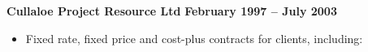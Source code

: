 \documentclass[10pt]{article}
\newenvironment{outerlist}[1][\enskip\textbullet]%
        {\begin{itemize}[#1]}{\end{itemize}%
         \vspace{-.6\baselineskip}}
\newcommand{\blankline}{\quad\pagebreak[2]}
\begin{document}
%

\blankline

\textbf{Cullaloe Project Resource Ltd}        \hfill \textbf{February 1997 -- July 2003}

\begin{outerlist}
\item[] Fixed rate, fixed price and cost-plus contracts for clients, including:

\begin{outerlist}


\end{outerlist}
\end{outerlist}
\end{document}
